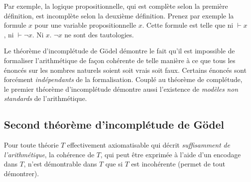 Par exemple, la logique propositionnelle, qui est complète selon la première définition, est incomplète selon la deuxième définition.
Prenez par exemple la formule $x$ pour une variable propositionnelle $x$. Cette formule est telle que ni $\vdash x$, ni $\vdash \neg x$. Ni $x$. $\neg x$ ne sont des tautologies.

Le théorème d'incomplétude de Gödel démontre le fait qu'il est impossible de formaliser l'arithmétique de façon cohérente de telle manière à ce que tous les énoncés sur les nombres naturels soient soit vrais soit faux.
Certains énoncés sont forcément \emph{indépendants} de la formalisation.
Couplé au théorème de complétude, le premier théorème d'incomplétude démontre aussi l'existence de \emph{modèles non standards} de l'arithmétique.

\subsection{Second théorème d'incomplétude de Gödel}

Pour toute théorie $T$ effectivement axiomatisable qui décrit \textit{suffisamment de l'arithmétique}, la cohérence de $T$, qui peut être exprimée à l'aide d'un encodage dans $T$, n'est démontrable dans $T$ que si $T$ est incohérente (permet de tout démontrer).
